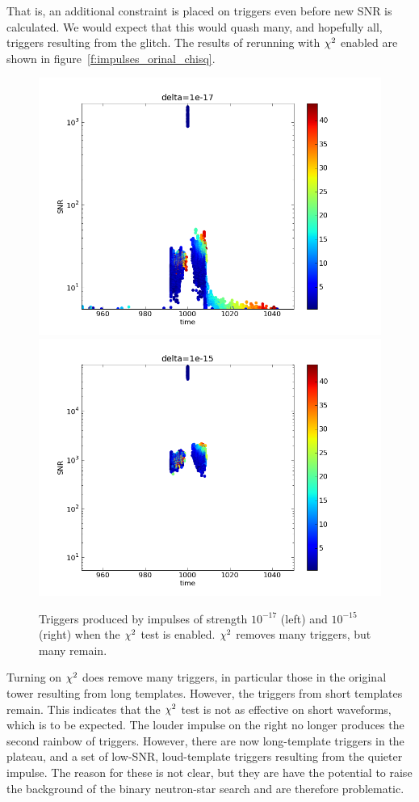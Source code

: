 That is, an additional constraint is placed on triggers even before
new SNR is calculated.  We would expect that this would quash many,
and hopefully all, triggers resulting from the glitch.  The results of
rerunning with $\chisq$ enabled are shown in
figure~\ref{f:impulses_orinal_chisq}.

\begin{figure}
  \includegraphics[width=0.5\linewidth]{figures/detchar/delta_chisq_1e-17}
  \includegraphics[width=0.5\linewidth]{figures/detchar/delta_chisq_1e-15}
  \caption[Triggers produced by loud impulses with $\chisq$ enabled] {
  \label{f:impulses_original_chisq}
Triggers produced by impulses of strength $10^{-17}$ (left) and
$10^{-15}$ (right) when the $\chisq$ test is enabled.  $\chisq$
removes many triggers, but many remain.
}
\end{figure}%

Turning on $\chisq$ does remove many triggers, in particular those in
the original tower resulting from long templates.  However, the
triggers from short templates remain.  This indicates that the
$\chisq$ test is not as effective on short waveforms, which is to be
expected.  The louder impulse on the right no longer produces the
second rainbow of triggers.  However, there are now long-template
triggers in the plateau, and a set of low-SNR, loud-template triggers
resulting from the quieter impulse.  The reason for these is not
clear, but they are have the potential to raise the background of the
binary neutron-star search and are therefore problematic.

